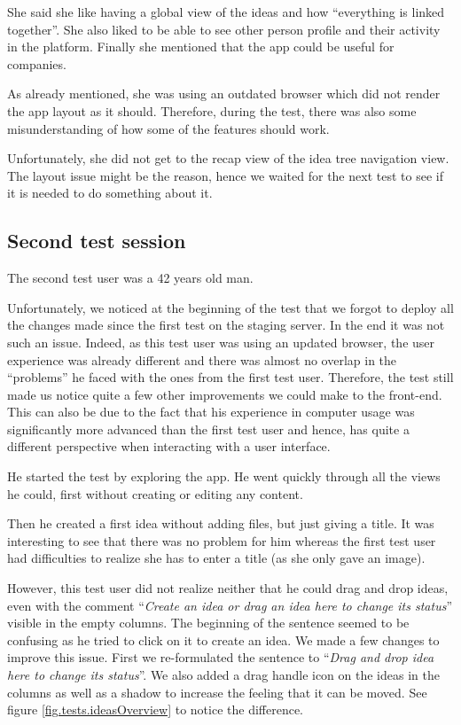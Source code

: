 \documentclass[a4paper,12pt, oneside]{article}
\begin{document}
She said she like having a global view of the ideas and how “everything is linked together”.
She also liked to be able to see other person profile and their activity in the platform.
Finally she mentioned that the app could be useful for companies.

As already mentioned, she was using an outdated browser which did not render the app layout as it should.
Therefore, during the test, there was also some misunderstanding of how some of the features should work.

Unfortunately, she did not get to the recap view of the idea tree navigation view.
The layout issue might be the reason, hence we waited for the next test to see if it is needed to do something about it.

\subsection{Second test session}
The second test user was a 42 years old man.

Unfortunately, we noticed at the beginning of the test that we forgot to deploy all the changes made since the first test on the staging server.
In the end it was not such an issue.
Indeed, as this test user was using an updated browser, the user experience was already different and there was almost no overlap in the “problems” he faced with the ones from the first test user.
Therefore, the test still made us notice quite a few other improvements we could make to the front-end.
This can also be due to the fact that his experience in computer usage was significantly more advanced than the first test user and hence, has quite a different perspective when interacting with a user interface.

He started the test by exploring the app.
He went quickly through all the views he could, first without creating or editing any content.

Then he created a first idea without adding files, but just giving a title.
It was interesting to see that there was no problem for him whereas the first test user had difficulties to realize she has to enter a title (as she only gave an image).

However, this test user did not realize neither that he could drag and drop ideas, even with the comment “\emph{Create an idea or drag an idea here to change its status}” visible in the empty columns.
The beginning of the sentence seemed to be confusing as he tried to click on it to create an idea.
We made a few changes to improve this issue.
First we re-formulated the sentence to “\emph{Drag and drop idea here to change its status}”.
We also added a drag handle icon on the ideas in the columns as well as a shadow to increase the feeling that it can be moved.
See figure \ref{fig.tests.ideasOverview} to notice the difference.
\end{document}
